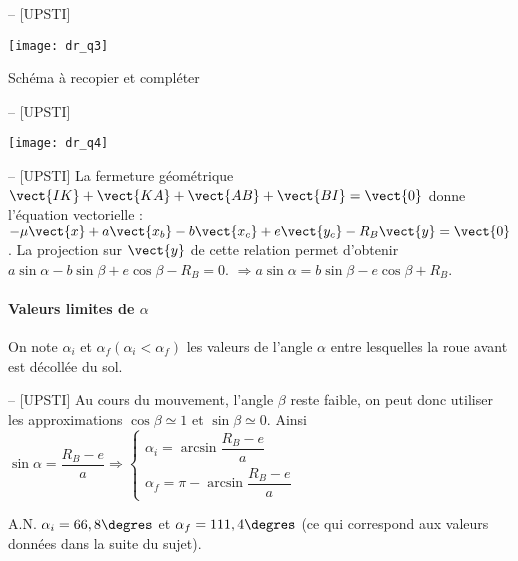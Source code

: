 \ifprof
\begin{corrige}-- [UPSTI]
\end{corrige}
\else
\fi
\begin{center}
\texttt{[image: dr\_q3]}

Schéma à recopier et compléter
\end{center}

\ifprof
\begin{corrige}-- [UPSTI]
\end{corrige}
\else
\fi

\begin{center}
\texttt{[image: dr\_q4]}
\end{center}

\ifprof
\begin{corrige}-- [UPSTI]
La fermeture géométrique $\vect{IK}+\vect{KA}+\vect{AB}+\vect{BI}=\vect{0}$ donne l’équation vectorielle :
$-\mu\vect{x}+a\vect{x_b}-b\vect{x_c}+e\vect{y_c}-R_B \vect{y} = \vect{0}$.
La projection sur  $\vect{y}$ de cette relation permet d’obtenir $a\sin\alpha -b\sin\beta +e\cos\beta-R_B=0$.
$\Rightarrow  a\sin\alpha =b\sin\beta -e\cos\beta +R_B$.

\end{corrige}
\else
\fi

\paragraph*{Valeurs limites de \(\alpha\)} On note \(\alpha_{i}\) et \(\alpha_{f}\left(\alpha_{i}<\alpha_{f}\right)\) les valeurs de l'angle \(\alpha\) entre lesquelles la roue avant est décollée du sol.

\ifprof
\begin{corrige}-- [UPSTI]
Au cours du mouvement, l’angle $\beta$ reste faible, on peut donc utiliser les approximations $\cos\beta\simeq 1$ et $\sin\beta\simeq 0$.
Ainsi $\sin\alpha=\dfrac{R_B-e}{a} \Rightarrow \left\{ \begin{array}{l} 
\alpha_i=\arcsin\dfrac{R_B-e}{a} \\
\alpha_f=\pi -\arcsin \dfrac{R_B-e}{a}
\end{array}\right.$

A.N. $\alpha_i=66,8\degres$ et $\alpha_f=111,4\degres$ (ce qui correspond aux valeurs données dans la suite du sujet).

\end{corrige}
\else
\fi

